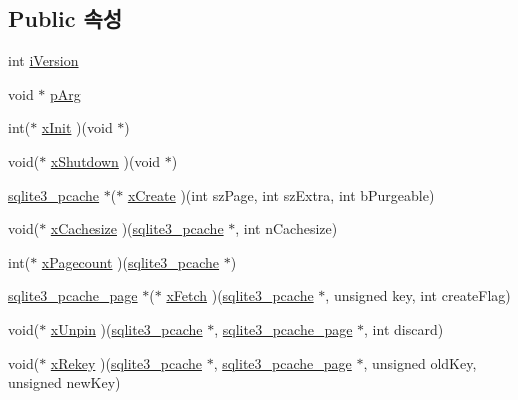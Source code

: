 \subsection*{Public 속성}
\begin{DoxyCompactItemize}
\item 
int \hyperlink{structsqlite3__pcache__methods2_a03b27be6c7cb8f1d2662c454cbe58483}{i\+Version}
\item 
void $\ast$ \hyperlink{structsqlite3__pcache__methods2_aee83131f16bb88218d7b0339854719d6}{p\+Arg}
\item 
int($\ast$ \hyperlink{structsqlite3__pcache__methods2_a21f7fdd82d029d3b0567c573c012adfc}{x\+Init} )(void $\ast$)
\item 
void($\ast$ \hyperlink{structsqlite3__pcache__methods2_a4285fc03adf01cbd3283644a1072ffef}{x\+Shutdown} )(void $\ast$)
\item 
\hyperlink{sqlite3_8h_a096c453d937d51f7926d7d31c8e0bd2f}{sqlite3\+\_\+pcache} $\ast$($\ast$ \hyperlink{structsqlite3__pcache__methods2_aa8babc280d7ba89c6c279301d5a36d69}{x\+Create} )(int sz\+Page, int sz\+Extra, int b\+Purgeable)
\item 
void($\ast$ \hyperlink{structsqlite3__pcache__methods2_a76de689adc20fdbfef427b1c7ae1bcea}{x\+Cachesize} )(\hyperlink{sqlite3_8h_a096c453d937d51f7926d7d31c8e0bd2f}{sqlite3\+\_\+pcache} $\ast$, int n\+Cachesize)
\item 
int($\ast$ \hyperlink{structsqlite3__pcache__methods2_a16b85f7889b050702c739eccf2f0c036}{x\+Pagecount} )(\hyperlink{sqlite3_8h_a096c453d937d51f7926d7d31c8e0bd2f}{sqlite3\+\_\+pcache} $\ast$)
\item 
\hyperlink{structsqlite3__pcache__page}{sqlite3\+\_\+pcache\+\_\+page} $\ast$($\ast$ \hyperlink{structsqlite3__pcache__methods2_a6283d91a6ad5037fad33003c2198c9f7}{x\+Fetch} )(\hyperlink{sqlite3_8h_a096c453d937d51f7926d7d31c8e0bd2f}{sqlite3\+\_\+pcache} $\ast$, unsigned key, int create\+Flag)
\item 
void($\ast$ \hyperlink{structsqlite3__pcache__methods2_a8fcb4ba48106aac8dfff247baea06e1a}{x\+Unpin} )(\hyperlink{sqlite3_8h_a096c453d937d51f7926d7d31c8e0bd2f}{sqlite3\+\_\+pcache} $\ast$, \hyperlink{structsqlite3__pcache__page}{sqlite3\+\_\+pcache\+\_\+page} $\ast$, int discard)
\item 
void($\ast$ \hyperlink{structsqlite3__pcache__methods2_ad5b7609bdc0d2ae80325f7925b76c0af}{x\+Rekey} )(\hyperlink{sqlite3_8h_a096c453d937d51f7926d7d31c8e0bd2f}{sqlite3\+\_\+pcache} $\ast$, \hyperlink{structsqlite3__pcache__page}{sqlite3\+\_\+pcache\+\_\+page} $\ast$, unsigned old\+Key, unsigned new\+Key)

\end{DoxyCompactItemize}

